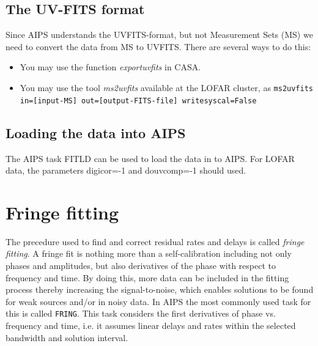 \subsection{The UV-FITS format}
Since AIPS understands the UVFITS-format, but not Measurement Sets (MS)
we need to convert the data from MS to UVFITS. There are several ways to do this:
\begin{itemize}
\item You may use the function \emph{exportuvfits} in CASA.
\item You may use the tool \emph{ms2uvfits} available at the LOFAR cluster, as {\tt ms2uvfits in=[input-MS] out=[output-FITS-file] writesyscal=False}
\end{itemize}

\subsection{Loading the data into AIPS}
The AIPS task FITLD can be used to load the data in to AIPS. For LOFAR data,
the parameters digicor=-1 and douvcomp=-1 should used.

\section{Fringe fitting}
The precedure used to find and correct residual rates and delays is called
\emph{fringe fitting}. A fringe fit is nothing more than a self-calibration
including not only phases and amplitudes, but also derivatives of the phase
with respect to frequency and time.  By doing this, more data can be included
in the fitting process thereby increasing the signal-to-noise, which enables
solutions to be found for weak sources and/or in noisy data. In AIPS the most
commonly used task for this is called \verb!FRING!. This task considers the
first derivatives of phase vs. frequency and time, i.e. it assumes linear
delays and rates within the selected bandwidth and solution interval.  


